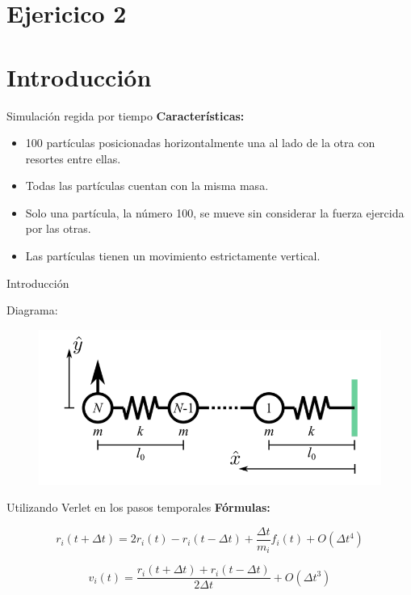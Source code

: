 \section{Ejericico 2}\label{sec:ejer2}


\section{Introducción}\label{sec:introduccion}
\begin{frame}{Simulación regida por tiempo}
    \textbf{Características:}
    \begin{itemize}
        \item 100 partículas posicionadas horizontalmente una al lado de la otra con resortes entre ellas.
        \item Todas las partículas cuentan con la misma masa.
        \item Solo una partícula, la número 100, se mueve sin considerar la fuerza ejercida por las otras.
        \item Las partículas tienen un movimiento estrictamente vertical.
    \end{itemize}
\end{frame}

\begin{frame}{Introducción}
    \begin{block}{Diagrama:}
        \begin{figure}
            \centering
            \includegraphics[width=0.8\linewidth]{pic/01-introduccion/diagrama}
        \end{figure}
    \end{block}
\end{frame}

\begin{frame}{Utilizando Verlet en los pasos temporales}
    \textbf{Fórmulas:}

    \vspace{5pt}
    \begin{equation*}
        r_i(t + \Delta{t}) = 2 r_i(t) - r_i(t-\Delta{t}) + \frac{\Delta{t}}{m_i} f_i(t) + O(\Delta{t}^4)
    \end{equation*}
    
    \vspace{20pt}
    \begin{equation*}
        v_i(t) = \frac{r_i(t+\Delta{t}) + r_i(t-\Delta{t})}{2\Delta{t}} + O(\Delta{t}^3)
    \end{equation*}
\end{frame}

